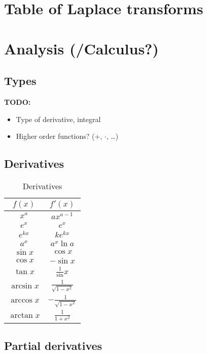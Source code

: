 \section{Table of Laplace transforms}


\section{Analysis (/Calculus?)} 
\subsection{Types}
\textbf{TODO:} 
\begin{itemize}
    \item Type of derivative, integral 
    \item Higher order functions? (+, $\cdot$, \dots)
\end{itemize}

\subsection{Derivatives}

\begin{table}[h!]
    \centering
    \caption{Derivatives}
    \begin{tabular}{|c|c|}
    \hline 
         $f(x)$ & $f'(x)$ \\
    \hline 
         $x^a$ & $ax^{a-1}$ \\
         $e^x$ & $e^x$ \\
         $e^{kx}$ & $ke^{kx}$ \\
         $a^{x}$ & $a^x \ln a $ \\
         $\sin x$ & $\cos x$ \\
         $\cos x$ & $-\sin x$ \\
         $\tan x$ & $\frac{1}{\sin} x$ \\
         $\arcsin x$ & $\frac{1}{\sqrt{1-x^2}}$ \\
         $\arccos x$ & $-\frac{1}{\sqrt{1-x^2}}$\\
         $\arctan x$ & $\frac{1}{1+x^2}$
         \\ \hline
    \end{tabular}
    \label{tab:derivatives}
\end{table}

\subsection{Partial derivatives}

